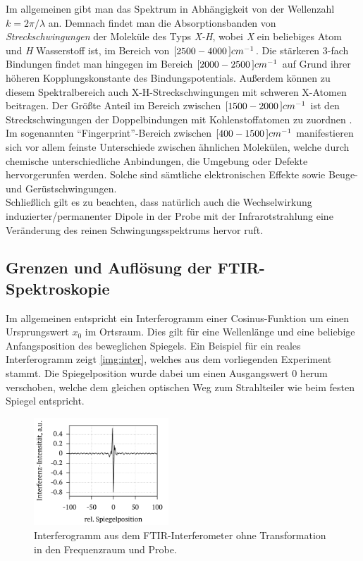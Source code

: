 \documentclass[a4paper,10pt,twocolumn]{article}
\newcommand{\ix}[1]{_\text{#1}}
\newcommand{\tilt}[1]{\textit{#1}}
\begin{document}
		Im allgemeinen gibt man das Spektrum in Abh\"angigkeit von der Wellenzahl $k=2\pi/\lambda$ an. Demnach findet man die Absorptionsbanden von \tilt{Streckschwingungen} der Molek\"ule des Typs \tilt{X-H}, wobei \tilt{X} ein beliebiges Atom und \tilt{H} Wasserstoff ist, im Bereich von $\unit[[2500-4000]]{cm^{-1}}$. Die st\"arkeren 3-fach Bindungen findet man hingegen im Bereich $\unit[[2000-2500]]{cm^{-1}}$ auf Grund ihrer h\"oheren Kopplungskonstante des Bindungspotentials. Au{\ss}erdem k\"onnen zu diesem Spektralbereich auch X-H-Streckschwingungen mit schweren X-Atomen beitragen. Der Gr\"o{\ss}te Anteil im Bereich zwischen $\unit[[1500-2000]]{cm^{-1}}$ ist den Streckschwingungen der Doppelbindungen mit Kohlenstoffatomen zu zuordnen \cite{FTIRAns}.\\
		Im sogenannten ``Fingerprint''-Bereich zwischen $\unit[[400-1500]]{cm^{-1}}$ manifestieren sich vor allem feinste Unterschiede zwischen \"ahnlichen Molek\"ulen, welche durch chemische unterschiedliche Anbindungen, die Umgebung oder Defekte hervorgerunfen werden. Solche sind s\"amtliche elektronischen Effekte sowie Beuge- und Ger\"ustschwingungen.\\
		Schlie{\ss}lich gilt es zu beachten, dass nat\"urlich auch die Wechselwirkung induzierter/permanenter Dipole in der Probe mit der Infrarotstrahlung eine Ver\"anderung des reinen Schwingungsspektrums hervor ruft.
		
	\subsection{Grenzen und Aufl\"osung der FTIR-Spektroskopie}
	
		Im allgemeinen entspricht ein Interferogramm einer Cosinus-Funktion um einen Ursprungswert $x\ix{0}$ im Ortsraum. Dies gilt f\"ur eine Wellenl\"ange und eine beliebige Anfangsposition des beweglichen Spiegels. Ein Beispiel f\"ur ein reales Interferogramm zeigt \autoref{img:inter}, welches aus dem vorliegenden Experiment stammt. Die Spiegelposition wurde dabei um einen Ausgangswert 0 herum verschoben, welche dem gleichen optischen Weg zum Strahlteiler wie beim festen Spiegel entspricht.
		
		\begin{figure}[h]
			\centering
			\includegraphics[width=0.45\textwidth]{Gruppe2A/inter.pdf}
			\caption{Interferogramm aus dem FTIR-Interferometer ohne Transformation in den Frequenzraum und Probe.}
			\label{img:inter}
		\end{figure}
	
\end{document}
